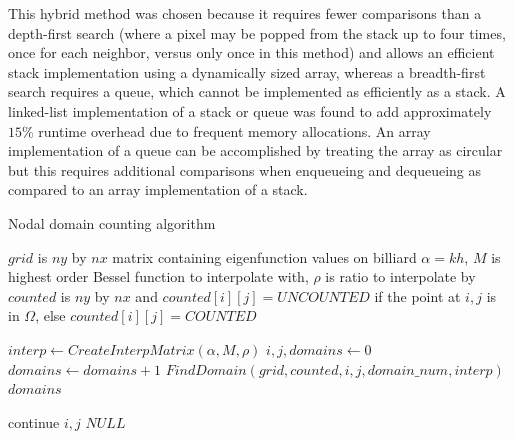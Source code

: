\documentclass{report}
\begin{document}
This hybrid method was chosen because it requires fewer comparisons than a depth-first search (where a pixel may be popped from the stack up to four times, once for each neighbor, versus only once in this method) and allows an efficient stack implementation using a dynamically sized array, whereas a breadth-first search requires a queue, which cannot be implemented as efficiently as a stack. A linked-list implementation of a stack or queue was found to add approximately $15\%$ runtime overhead due to frequent memory allocations. An array implementation of a queue can be accomplished by treating the array as circular but this requires additional comparisons when enqueueing and dequeueing as compared to an array implementation of a stack.

\begin{algorithm}
  \caption{Nodal domain counting algorithm}
  \begin{algorithmic}
    \Require $grid$ is $ny$ by $nx$ matrix containing eigenfunction values on billiard
    \Require $\alpha = k h$, $M$ is highest order Bessel function to interpolate with, $\rho$ is ratio to interpolate by
    \Require $counted$ is $ny$ by $nx$ and $counted[i][j] = UNCOUNTED$ if the point at $i,j$ is in $\Omega$, else $counted[i][j] = COUNTED$

    \item[]
        \State $interp \gets CreateInterpMatrix(\alpha, M, \rho)$
        \State $i,j,domains \gets 0$
            \State $domains \gets domains + 1$
            \State $FindDomain(grid, counted, i, j, domain\_num, interp)$
        \EndWhile \\
        \Return $domains$
    \EndFunction

    \item[]
                    \State continue
                \EndIf
                    \State \Return $i,j$
                \EndIf
            \EndFor
        \EndFor
        \State \Return $NULL$
    \EndFunction
  \end{algorithmic}
\end{algorithm}
\end{document}
